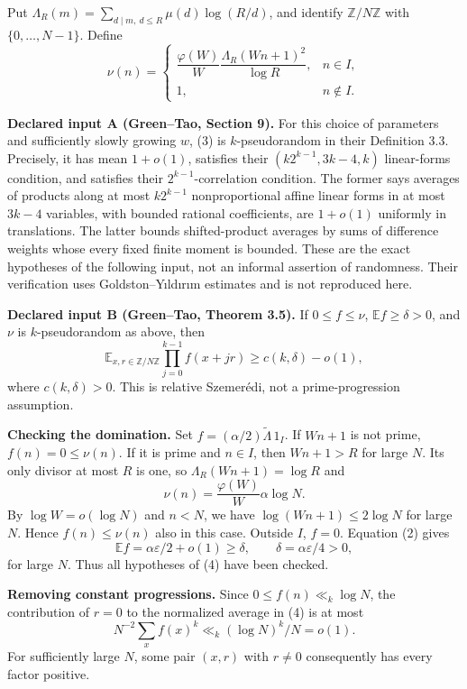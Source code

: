 Put $\Lambda_R(m)=\sum_{d\mid m,\ d\leq R}\mu(d)\log(R/d)$, and identify $\mathbb Z/N\mathbb Z$ with $\{0,\ldots,N-1\}$. Define
\[
\nu(n)=\begin{cases}
\dfrac{\varphi(W)}W\dfrac{\Lambda_R(Wn+1)^2}{\log R},&n\in I,\\
1,&n\notin I.
\end{cases}
\tag{3}
\]

\textbf{Declared input A (Green--Tao, Section 9).} For this choice of parameters and sufficiently slowly growing $w$, (3) is $k$-pseudorandom in their Definition 3.3. Precisely, it has mean $1+o(1)$, satisfies their $(k2^{k-1},3k-4,k)$ linear-forms condition, and satisfies their $2^{k-1}$-correlation condition. The former says averages of products along at most $k2^{k-1}$ nonproportional affine linear forms in at most $3k-4$ variables, with bounded rational coefficients, are $1+o(1)$ uniformly in translations. The latter bounds shifted-product averages by sums of difference weights whose every fixed finite moment is bounded. These are the exact hypotheses of the following input, not an informal assertion of randomness. Their verification uses Goldston--Y\i ld\i r\i m estimates and is not reproduced here.

\textbf{Declared input B (Green--Tao, Theorem 3.5).} If $0\leq f\leq\nu$, $\mathbb E f\geq\delta>0$, and $\nu$ is $k$-pseudorandom as above, then
\[
\mathbb E_{x,r\in\mathbb Z/N\mathbb Z}
\prod_{j=0}^{k-1}f(x+jr)\geq c(k,\delta)-o(1),
\tag{4}
\]
where $c(k,\delta)>0$. This is relative Szemer\'edi, not a prime-progression assumption.

\textbf{Checking the domination.} Set $f=(\alpha/2)\widetilde\Lambda\,1_I$. If $Wn+1$ is not prime, $f(n)=0\leq\nu(n)$. If it is prime and $n\in I$, then $Wn+1>R$ for large $N$. Its only divisor at most $R$ is one, so $\Lambda_R(Wn+1)=\log R$ and
\[
\nu(n)=\frac{\varphi(W)}W\alpha\log N.
\]
By $\log W=o(\log N)$ and $n<N$, we have $\log(Wn+1)\leq2\log N$ for large $N$. Hence $f(n)\leq\nu(n)$ also in this case. Outside $I$, $f=0$. Equation (2) gives
\[
\mathbb E f=\alpha\varepsilon/2+o(1)\geq\delta,
\qquad \delta=\alpha\varepsilon/4>0,
\tag{5}
\]
for large $N$. Thus all hypotheses of (4) have been checked.

\textbf{Removing constant progressions.} Since $0\leq f(n)\ll_k\log N$, the contribution of $r=0$ to the normalized average in (4) is at most
\[
N^{-2}\sum_x f(x)^k\ll_k (\log N)^k/N=o(1).
\]
For sufficiently large $N$, some pair $(x,r)$ with $r\ne0$ consequently has every factor positive.

